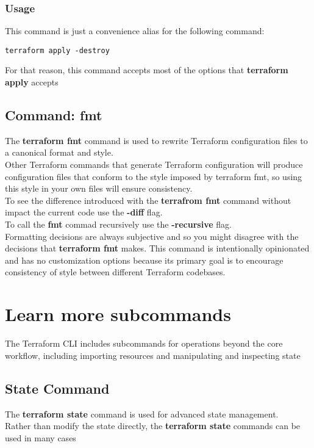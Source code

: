 \documentclass[12pt, letterpaper, twoside]{article}
\begin{document}
\subsubsection{Usage}
This command is just a convenience alias for the following command:
\begin{verbatim}
terraform apply -destroy
\end{verbatim}
For that reason, this command accepts most of the options that \textbf{terraform apply} accepts

\subsection{Command: fmt}
The \textbf{terraform fmt} command is used to rewrite Terraform configuration files 
to a canonical format and style.\\
Other Terraform commands that generate Terraform configuration will produce configuration 
files that conform to the style imposed by terraform fmt, so using this style in your own 
files will ensure consistency.\\

To see the difference introduced with the \textbf{terrafrom fmt} command without impact the 
current code use the \textbf{-diff} flag.\\

To call the \textbf{fmt} commad recursively use the \textbf{-recursive} flag.\\

Formatting decisions are always subjective and so you might disagree with the decisions 
that \textbf{terraform fmt} makes. This command is intentionally opinionated and has no customization 
options because its primary goal is to encourage consistency of style between different Terraform codebases.\\

\section{Learn more subcommands}
The Terraform CLI includes subcommands for operations beyond the core workflow, including 
importing resources and manipulating and inspecting state

\subsection{State Command}
The \textbf{terraform state} command is used for advanced state management.\\
Rather than modify the state directly, the \textbf{terraform state} commands can 
be used in many cases
\end{document}
